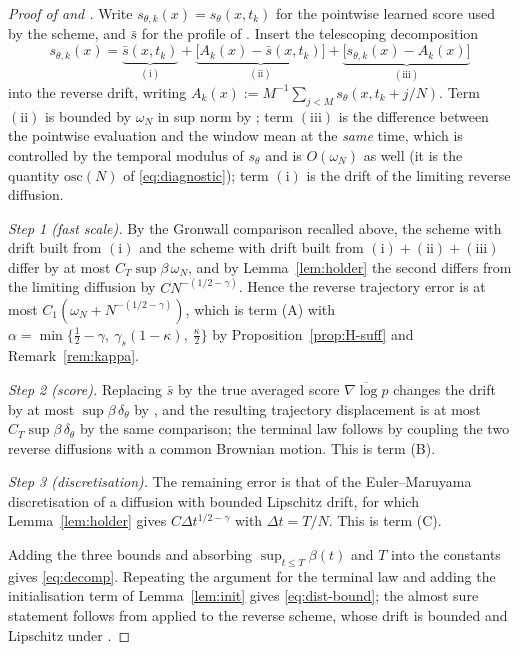 \documentclass[a4paper,fleqn]{cas-dc}
\theoremstyle{definition}
\begin{document}
\begin{proof}[Proof of  and ]
Write $s_{\theta,k}(x)=s_{\theta}(x,t_{k})$ for the pointwise learned score used by the
scheme, and $\bar s$ for the profile of . Insert the telescoping
decomposition
\begin{equation}
s_{\theta,k}(x)=\underbrace{\bar s(x,t_{k})}_{(\mathrm{i})}
+\underbrace{\bigl[A_{k}(x)-\bar s(x,t_{k})\bigr]}_{(\mathrm{ii})}
+\underbrace{\bigl[s_{\theta,k}(x)-A_{k}(x)\bigr]}_{(\mathrm{iii})}
\label{eq:telescope}
\end{equation}
into the reverse drift, writing $A_{k}(x):=M^{-1}\sum_{j<M}s_{\theta}(x,t_{k}+j/N)$. Term $(\mathrm{ii})$ is bounded by $\omega_{N}$ in sup norm by
; term $(\mathrm{iii})$ is the difference between the pointwise evaluation
and the window mean at the \emph{same} time, which is controlled by the temporal
modulus of $s_{\theta}$ and is $O(\omega_{N})$ as well (it is the quantity
$\mathrm{osc}(N)$ of \eqref{eq:diagnostic}); term $(\mathrm{i})$ is the drift of the
limiting reverse diffusion.

\emph{Step 1 (fast scale).} By the Gronwall comparison recalled above, the scheme with
drift built from $(\mathrm{i})$ and the scheme with drift built from
$(\mathrm{i})+(\mathrm{ii})+(\mathrm{iii})$ differ by at most
$C_{T}\sup\beta\,\omega_{N}$, and by Lemma~\ref{lem:holder} the second differs from the
limiting diffusion by $C N^{-(1/2-\gamma)}$. Hence the reverse trajectory error is at
most $C_{1}(\omega_{N}+N^{-(1/2-\gamma)})$, which is term (A) with
$\alpha=\min\{\tfrac12-\gamma,\ \gamma_{s}(1-\kappa),\ \tfrac{\kappa}{2}\}$ by
Proposition~\ref{prop:H-suff} and Remark~\ref{rem:kappa}.

\emph{Step 2 (score).} Replacing $\bar s$ by the true averaged score
$\overline{\nabla\log p}$ changes the drift by at most $\sup\beta\,\delta_{\theta}$ by
, and the resulting trajectory displacement is at most
$C_{T}\sup\beta\,\delta_{\theta}$ by the same comparison; the terminal law follows by
coupling the two reverse diffusions with a common Brownian motion. This is term (B).

\emph{Step 3 (discretisation).} The remaining error is that of the Euler--Maruyama
discretisation of a diffusion with bounded Lipschitz drift, for which
Lemma~\ref{lem:holder} gives $C\Delta t^{1/2-\gamma}$ with $\Delta t=T/N$. This is term (C).

Adding the three bounds and absorbing $\sup_{t\le T}\beta(t)$ and $T$ into the
constants gives \eqref{eq:decomp}. Repeating the argument for the terminal law and
adding the initialisation term of Lemma~\ref{lem:init} gives \eqref{eq:dist-bound}; the
almost sure statement follows from  applied to the reverse scheme,
whose drift is bounded and Lipschitz under .
\end{proof}
\end{document}
